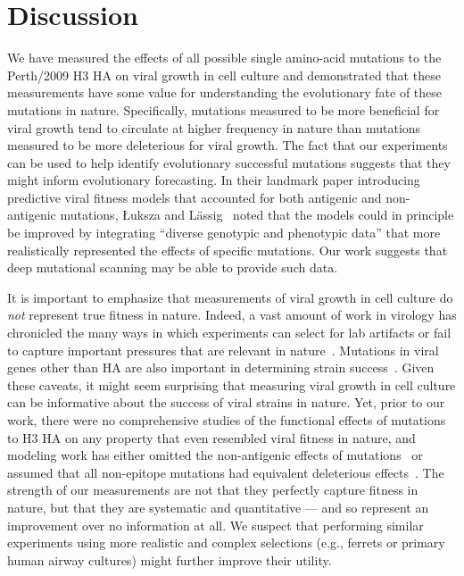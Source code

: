 \documentclass[9pt,twocolumn,twoside]{pnas-new}
\begin{document}
\section*{Discussion}
\label{sec:discussion}
We have measured the effects of all possible single amino-acid mutations to the Perth/2009 H3 HA on viral growth in cell culture and demonstrated that these measurements have some value for understanding the evolutionary fate of these mutations in nature.
Specifically, mutations measured to be more beneficial for viral growth tend to circulate at higher frequency in nature than mutations measured to be more deleterious for viral growth.
The fact that our experiments can be used to help identify evolutionary successful mutations suggests that they might inform evolutionary forecasting.
In their landmark paper introducing predictive viral fitness models that accounted for both antigenic and non-antigenic mutations, {\L}uksza and L{\"a}ssig~\cite{luksza2014predictive} noted that the models could in principle be improved by integrating ``diverse genotypic and phenotypic data'' that more realistically represented the effects of specific mutations.
Our work suggests that deep mutational scanning may be able to provide such data.

It is important to emphasize that measurements of viral growth in cell culture do \emph{not} represent true fitness in nature.
Indeed, a vast amount of work in virology has chronicled the many ways in which experiments can select for lab artifacts or fail to capture important pressures that are relevant in nature~\cite{daniels1985fusion,sun2010modifications,lee2013comparison,wu2017structural}.
Mutations in viral genes other than HA are also important in determining strain success~\cite{memoli2009recent,raghwani2017selection}.
Given these caveats, it might seem surprising that measuring viral growth in cell culture can be informative about the success of viral strains in nature.
Yet, prior to our work, there were no comprehensive studies of the functional effects of mutations to H3 HA on any property that even resembled viral fitness in nature, and modeling work has either omitted the non-antigenic effects of mutations~\cite{sun2013using,harvey2016identification,neher2016prediction} or assumed that all non-epitope mutations had equivalent deleterious effects~\cite{luksza2014predictive}.
The strength of our measurements are not that they perfectly capture fitness in nature, but that they are systematic and quantitative --- and so represent an improvement over no information at all.
We suspect that performing similar experiments using more realistic and complex selections (e.g., ferrets or primary human airway cultures) might further improve their utility.
\end{document}
